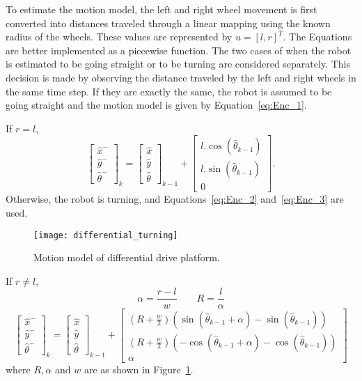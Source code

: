 To estimate the motion model, the left and right wheel movement is first converted into distances traveled through a linear mapping using the known radius of the wheels. These values are represented by $ u = [ l, r ]^T $. The Equations are better implemented as a piecewise function. The two cases of when the robot is estimated to be going straight or to be turning are considered separately. This decision is made by observing the distance traveled by the left and right wheels in the same time step. If they are exactly the same, the robot is assumed to be going straight and the motion model is given by Equation~\ref{eq:Enc_1}.

If $ r = l $,
\begin{equation}
\label{eq:Enc_1}
	\begin{bmatrix}
		\hat{x}^-\\\hat{y}^-\\\hat{\theta}^-
	\end{bmatrix}_k
	=
	\begin{bmatrix}
		\hat{x}\\\hat{y}\\\hat{\theta}
	\end{bmatrix}_{k-1}
	+
	\begin{bmatrix}
		l.\cos(\hat{\theta}_{k-1})\\
		l.\sin(\hat{\theta}_{k-1})\\
		0
	\end{bmatrix}.
\end{equation}
Otherwise, the robot is turning, and Equations~\ref{eq:Enc_2} and~\ref{eq:Enc_3} are used.
			
\begin{figure}
\centering
\texttt{[image: differential\_turning]}
\caption{Motion model of differential drive platform.}
\label{fig:Enc_1}
\end{figure}

If $ r \neq l $,
\begin{equation}
\label{eq:Enc_2}
	\alpha= \frac{r-l}{w}
\qquad
	R=\frac{l}{\alpha}
\end{equation}
\begin{equation}
\label{eq:Enc_3}
	\begin{bmatrix}
		\hat{x}^-\\\hat{y}^-\\\hat{\theta}^-
	\end{bmatrix}_k
	=
	\begin{bmatrix}
		\hat{x}\\\hat{y}\\\hat{\theta}
	\end{bmatrix}_{k-1}
	+
	\begin{bmatrix}
		\left(R+\frac{w}{2}\right)(\sin(\hat{\theta}_{k-1}+\alpha)-\sin(\hat{\theta}_{k-1}))\\
		\left(R+\frac{w}{2}\right)(-\cos(\hat{\theta}_{k-1}+\alpha)-\cos(\hat{\theta}_{k-1}))\\
		\alpha
	\end{bmatrix}
\end{equation}
where $ R,\alpha $ and $ w $ are as shown in Figure~\ref{fig:Enc_1}.

